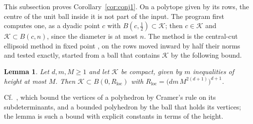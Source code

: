 \documentclass[11pt]{amsart}
\newtheorem{lemma}[theorem]{Lemma}
\theoremstyle{definition}
\numberwithin{equation}{section}
\newcommand{\cK}{\mathcal{K}}
\begin{document}
This subsection proves Corollary~\ref{cor:conj1}. On a polytope given by its rows, the centre of the unit ball inside it is not part of the input. The program first computes one, as a dyadic point $c$ with $B(c,\frac12)\subset\cK$; then $c\in\cK$ and $\cK\subset B(c,n)$, since the diameter is at most $n$. The method is the central-cut ellipsoid method in fixed point \cite[Theorem~(3.2.1)]{GLS93}, on the rows moved inward by half their norms and tested exactly, started from a ball that contains $\cK$ by the following bound.

\begin{lemma}\label{lem:loc}
Let $d,m,M\ge1$ and let $\cK$ be compact, given by $m$ inequalities of height at most $M$. Then $\cK\subset B(0,R_{\mathrm{loc}})$ with $R_{\mathrm{loc}}=\bigl(dm\,M^{2(d+1)}\bigr)^{d+1}$.
\end{lemma}

Cf.\ \cite[Lemmas~(6.2.4)(a) and~(6.2.5)]{GLS93}, which bound the vertices of a polyhedron by Cramer's rule on its subdeterminants, and a bounded polyhedron by the ball that holds its vertices; the lemma is such a bound with explicit constants in terms of the height.
\end{document}
